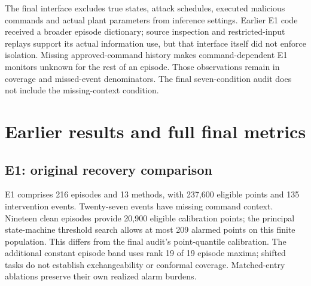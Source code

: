 \documentclass[11pt]{article}
\begin{document}
The final interface excludes true states, attack schedules, executed malicious commands and actual plant parameters from inference settings. Earlier E1 code received a broader episode dictionary; source inspection and restricted-input replays support its actual information use, but that interface itself did not enforce isolation. Missing approved-command history makes command-dependent E1 monitors unknown for the rest of an episode. Those observations remain in coverage and missed-event denominators. The final seven-condition audit does not include the missing-context condition.

\section{Earlier results and full final metrics}
\subsection{E1: original recovery comparison}
E1 comprises 216 episodes and 13 methods, with 237,600 eligible points and 135 intervention events. Twenty-seven events have missing command context. Nineteen clean episodes provide 20,900 eligible calibration points; the principal state-machine threshold search allows at most 209 alarmed points on this finite population. This differs from the final audit's point-quantile calibration. The additional constant episode band uses rank 19 of 19 episode maxima; shifted tasks do not establish exchangeability or conformal coverage. Matched-entry ablations preserve their own realized alarm burdens.
\begin{table}[htbp]\centering\small
\caption{E1 attack and recovery outcomes, retained from the saved presentation. Clearance counts condition on detected events with measured return.}
\setlength{\tabcolsep}{3pt}
\end{table}
\begin{table}[htbp]\centering\small
\caption{E1 additional metrics. Unknown states remain eligible, cannot count as detections, and receive AP score $-1$, below valid nonnegative scores.}
\setlength{\tabcolsep}{3pt}
\end{table}
\end{document}
